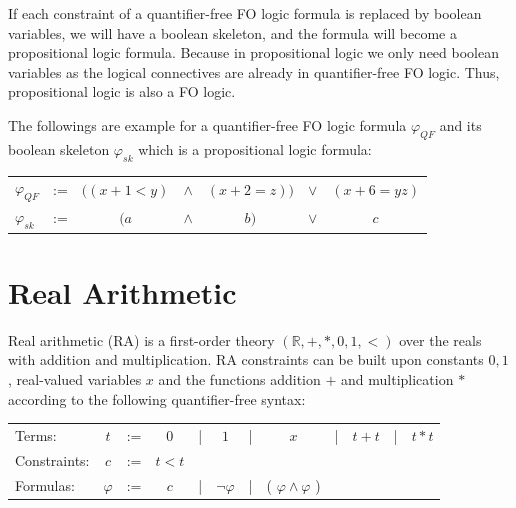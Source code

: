 \noindent If each constraint of a quantifier-free FO logic formula is replaced by boolean variables, we will have a boolean skeleton, and the formula will become a propositional logic formula.
Because in propositional logic we only need boolean variables as the logical connectives are already in quantifier-free FO logic.
Thus, propositional logic is also a FO logic.\newline

\begin{example}
    The followings are example for a quantifier-free FO logic formula $\varphi_{QF}$ and its boolean skeleton $\varphi_{sk}$ which is a propositional logic formula:
    \begin{table}[!ht]
    \centering
    \begin{tabular}{lcccccc}
    $\varphi_{QF}$ & := & $((x + 1 < y)$ & $\wedge$ & $(x + 2 = z))$ & $\vee$ & $(x + 6 = yz)$ \\
    $\varphi_{sk}$  & := & $(a$            & $\wedge$ & $b)$            & $\vee$ & $c$           
    \end{tabular}
    \end{table}
\end{example}
\section{Real Arithmetic}
\label{sec:Real_Arithmetic}
Real arithmetic (RA) is a first-order theory $(\mathbb{R}, +, \ast, 0, 1, <)$ over the reals with addition and multiplication. 
RA constraints can be built upon constants $0, 1$, real-valued variables $x$ and the functions addition $+$ and multiplication $\ast$ according to the following quantifier-free syntax:\newline

\begin{table}[!ht]
\begin{tabular}{lccccccccccc}
\centering
Terms:       & $t$       & := & $0$   & | & $1$            & | & $x$                          & | & $t+t$ & | & $t \ast t$ \\
Constraints: & $c$       & := & $t<t$ &   &                &   &                              &   &       &   &             \\
Formulas:    & $\varphi$ & := & $c$   & | & $\neg \varphi$ & | & ( $\varphi \wedge \varphi$ ) &   &       &   &           
\end{tabular}
\end{table}

